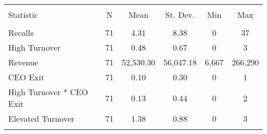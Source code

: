 
\begin{table}[!htbp] \centering 
  \caption{} 
  \label{} 
\begin{tabular}{@{\extracolsep{5pt}}lccccc} 
\\[-1.8ex]\hline 
\hline \\[-1.8ex] 
Statistic & \multicolumn{1}{c}{N} & \multicolumn{1}{c}{Mean} & \multicolumn{1}{c}{St. Dev.} & \multicolumn{1}{c}{Min} & \multicolumn{1}{c}{Max} \\ 
\hline \\[-1.8ex] 
Recalls & 71 & 4.31 & 8.38 & 0 & 37 \\ 
High Turnover & 71 & 0.48 & 0.67 & 0 & 3 \\ 
Revenue & 71 & 52,530.30 & 56,047.18 & 6,667 & 266,290 \\ 
CEO Exit & 71 & 0.10 & 0.30 & 0 & 1 \\ 
High Turnover * CEO Exit & 71 & 0.13 & 0.44 & 0 & 2 \\ 
Elevated Turnover & 71 & 1.38 & 0.88 & 0 & 3 \\ 
\hline \\[-1.8ex] 
\end{tabular} 
\end{table} 
